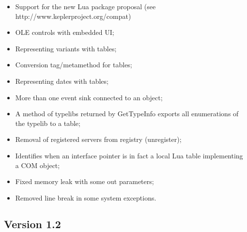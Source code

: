 \documentclass[11pt,a4paper,english]{report}
\begin{document}
\begin{itemize}

\item Support for the new Lua package proposal (see http://www.keplerproject.org/compat)

\item OLE controls with embedded UI;

\item Representing variants with tables;

\item Conversion tag/metamethod for tables;

\item Representing dates with tables;

\item More than one event sink connected to an object;

\item A method of typelibs returned by GetTypeInfo exports
  all enumerations of the typelib to a table;

\item Removal of registered servers from registry (unregister);

\item Identifies when an interface pointer is in fact a local Lua table
  implementing a COM object;

\item Fixed memory leak with some out parameters;

\item Removed line break in some system exceptions.

\end{itemize}

\subsection*{Version 1.2}
\end{document}
